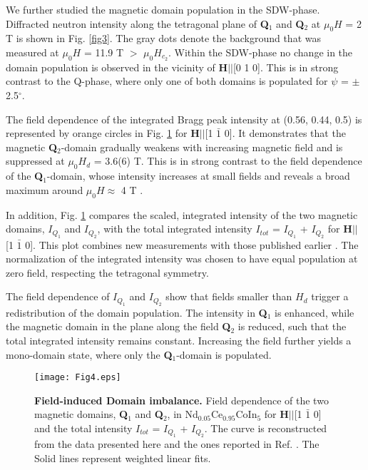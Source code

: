 \documentclass[article,twocolumn,showpacs,preprintnumbers,amsmath,amssymb, superscriptaddress]{revtex4-1}
\begin{document}
We further studied the magnetic domain population in the SDW-phase. Diffracted neutron intensity along the tetragonal plane of \textbf{Q$_1$} and \textbf{Q$_2$} at $\mu_0H$ = 2 T is shown in Fig. \ref{fig3}. The gray dots denote the background that was measured at $\mu_0H$ = 11.9 T $>$ $\mu_0H_{c_2}$.  Within the SDW-phase no change in the domain population is observed in the vicinity of \textbf{H}$||$[0 1 0]. This is in strong contrast to the Q-phase, where only one of both domains is populated for $\psi$ = $\pm$2.5$^\circ$. 

The field dependence of the integrated Bragg peak intensity at (0.56, 0.44, 0.5) is represented by orange circles in Fig. \ref{fig4} for \textbf{H}$||$[1 $\bar{1}$ 0]. It demonstrates that the magnetic \textbf{Q}$_2$-domain gradually weakens with increasing magnetic field and is suppressed at $\mu_0H_d$ = 3.6(6) T. This is in strong contrast to the field dependence of the \textbf{Q}$_1$-domain, whose intensity increases at small fields and reveals a broad maximum around $\mu_0H\approx$ 4 T  \cite{Mazzone2017}.

In addition, Fig. \ref{fig4} compares the scaled, integrated intensity of  the two magnetic domains, $I_{Q_1}$ and $I_{Q_2}$, with the total integrated intensity $I_{tot}$ = $I_{Q_1}$ + $I_{Q_2}$ for \textbf{H}$||$[1 $\bar{1}$ 0]. This plot combines new measurements with those published earlier \cite{Mazzone2017}. The normalization of the integrated intensity was chosen to have equal population at zero field, respecting the tetragonal symmetry.

The field dependence of $I_{Q_1}$ and $I_{Q_2}$ show that fields smaller than $H_d$ trigger a redistribution of the domain population. The intensity in \textbf{Q}$_1$ is enhanced, while the magnetic domain in the plane along the field \textbf{Q}$_2$ is reduced, such that the total integrated intensity remains constant. Increasing the field further yields a mono-domain state, where only the \textbf{Q}$_1$-domain is populated.
\begin{figure}[tbh]
	\begin{center}
\texttt{[image: Fig4.eps]}
\caption{\textbf{Field-induced Domain imbalance.} Field dependence of the two magnetic domains, \textbf{Q}$_1$ and \textbf{Q}$_2$, in Nd$_{0.05}$Ce$_{0.95}$CoIn$_5$ for \textbf{H}$||$[1 $\bar{1}$ 0] and the total intensity $I_{tot}$ = $I_{Q_1}$ + $I_{Q_2}$. The curve is reconstructed from the data presented here and the ones reported in Ref. \cite{Mazzone2017}. The Solid lines represent weighted linear fits. }
\label{fig4}
	\end{center}
\end{figure}
\end{document}
